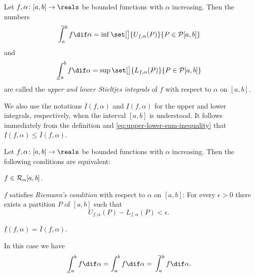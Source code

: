 \documentclass[article, a4paper, 11pt, oneside]{memoir}
\numberwithin{equation}{chapter}
\newcommand{\calP}{\mathcal{P}}
\begin{document}
\begin{definition}
    Let $f, \alpha \colon [a,b] \to \reals$ be bounded functions with $\alpha$ increasing. Then the numbers
    \begin{equation*}
        \upint_a^b f \dif\alpha
            = \inf \set[\big]{U_{f,\alpha}(P)}{P \in \calP[a,b]}
    \end{equation*}
    and
    \begin{equation*}
        \lowint_a^b f \dif\alpha
            = \sup \set[\big]{L_{f,\alpha}(P)}{P \in \calP[a,b]}
    \end{equation*}
    are called the \emph{upper and lower Stieltjes integrals} of $f$ with respect to $\alpha$ on $[a,b]$.
\end{definition}
%
We also use the notations $\overline{I}(f,\alpha)$ and $\underline{I}(f,\alpha)$ for the upper and lower integrals, respectively, when the interval $[a,b]$ is understood. It follows immediately from the definition and \cref{eq:upper-lower-sum-inequality} that $\underline{I}(f,\alpha) \leq \overline{I}(f,\alpha)$. 


\begin{theorem}
    Let $f,\alpha \colon [a,b] \to \reals$ be bounded functions with $\alpha$ increasing. Then the following conditions are equivalent:
    \begin{enumthm}
        \item \label{enum:integrability} $f \in \integrable[\alpha]{a,b}$.
        \item \label{enum:Riemanns-condition} $f$ satisfies \emph{Riemann's condition} with respect to $\alpha$ on $[a,b]$: For every $\epsilon > 0$ there exists a partition $P$ of $[a,b]$ such that
        \begin{equation}
            \label{eq:Riemanns-condition}
            U_{f,\alpha}(P) - L_{f,\alpha}(P) < \epsilon.
        \end{equation}
        \item \label{enum:upper-lower-integrals-equal} $\underline{I}(f,\alpha) = \overline{I}(f,\alpha)$.
    \end{enumthm}
    In this case we have
    \begin{equation*}
        \lowint_a^b f \dif\alpha
            = \int_a^b f \dif\alpha
            = \upint_a^b f \dif\alpha.
    \end{equation*}
\end{theorem}
\end{document}

